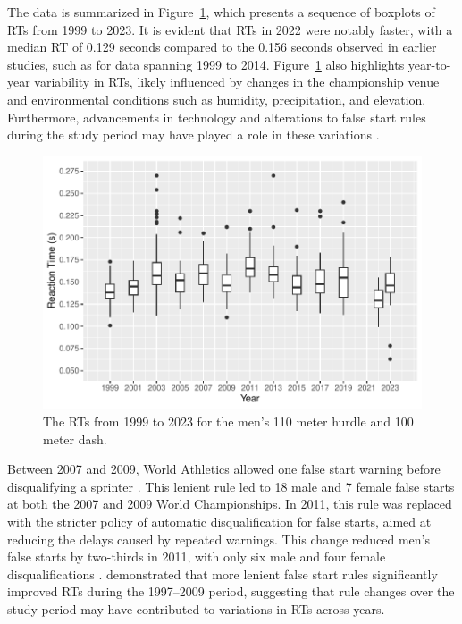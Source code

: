 \documentclass[12pt, letterpaper]{article}
\begin{document}
The data is summarized in Figure~\ref{fig:Boxplot}, which presents a
sequence of boxplots of RTs from 1999 to 2023. It is evident
that RTs in 2022 were notably faster, with a median RT of 0.129 seconds compared
to the 0.156 seconds observed in earlier studies, such as
\citet{brosnan2017effects} for data spanning 1999 to 2014.
Figure~\ref{fig:Boxplot} also highlights year-to-year variability in
RTs, likely influenced by changes in the championship venue
and environmental conditions such as humidity, precipitation, and
elevation. Furthermore, advancements in technology and alterations to
false start rules during the study period may have played a role in these
variations \citep{willwacher2013novel}.


\begin{figure}[tbp]
  \centering
  \includegraphics[width=\textwidth]{Boxplot}
  \caption{The RTs from 1999 to 2023 for the men's 110 meter hurdle
  and 100 meter dash.}
  \label{fig:Boxplot}
\end{figure}


Between 2007 and 2009, World Athletics allowed one
false start warning before disqualifying a sprinter \citep{iaaf2009falsestart}.
This lenient rule led to 18 male and 7 female false starts at both the 2007
and 2009 World Championships. In 2011, this rule was replaced with the stricter
policy of automatic disqualification for false starts, aimed at reducing the
delays caused by repeated warnings. This change reduced men’s false starts
by two-thirds in 2011, with only six male and four female disqualifications
\citep{iaaf2009falsestart}. \citet{haugen2013effect} demonstrated that more
lenient false start rules significantly improved RTs during the
1997–2009 period, suggesting that rule changes over the study period may
have contributed to variations in RTs across years.
\end{document}
